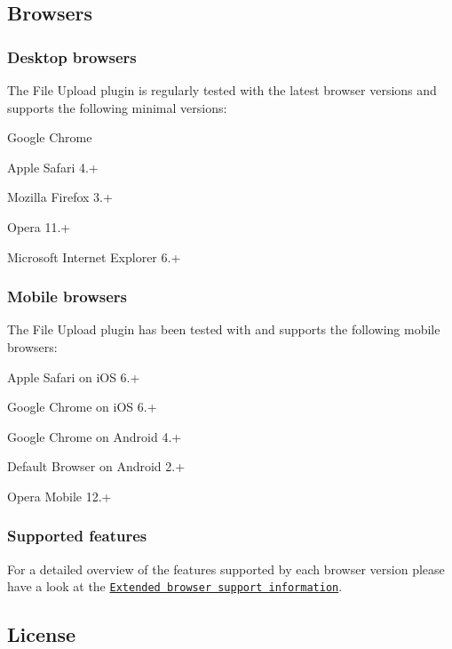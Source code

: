 \subsection*{Browsers}

\subsubsection*{Desktop browsers}

The File Upload plugin is regularly tested with the latest browser versions and supports the following minimal versions\-:


\begin{DoxyItemize}
\item Google Chrome
\item Apple Safari 4.+
\item Mozilla Firefox 3.+
\item Opera 11.+
\item Microsoft Internet Explorer 6.+
\end{DoxyItemize}

\subsubsection*{Mobile browsers}

The File Upload plugin has been tested with and supports the following mobile browsers\-:


\begin{DoxyItemize}
\item Apple Safari on i\-O\-S 6.+
\item Google Chrome on i\-O\-S 6.+
\item Google Chrome on Android 4.+
\item Default Browser on Android 2.+
\item Opera Mobile 12.+
\end{DoxyItemize}

\subsubsection*{Supported features}

For a detailed overview of the features supported by each browser version please have a look at the \href{https://github.com/blueimp/jQuery-File-Upload/wiki/Browser-support}{\tt Extended browser support information}.

\subsection*{License}

